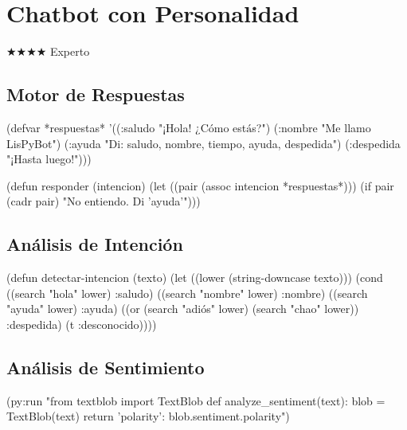 \chapter{Chatbot con Personalidad}
\label{chap:chatbot}
{\huge$\bigstar$}{\huge$\bigstar$}{\huge$\bigstar$}{\huge$\bigstar$} Experto

\section{Motor de Respuestas}
\begin{lispcode}
(defvar *respuestas*
  '((:saludo "\( ¡ \)Hola! \( ¿ \)C\( ó \)mo est\( á \)s?")
    (:nombre "Me llamo LisPyBot")
    (:ayuda "Di: saludo, nombre, tiempo, ayuda, despedida")
    (:despedida "\( ¡ \)Hasta luego!")))

(defun responder (intencion)
  (let ((pair (assoc intencion *respuestas*)))
    (if pair (cadr pair) "No entiendo. Di 'ayuda'")))
\end{lispcode}

\section{Análisis de Intención}
\begin{lispcode}
(defun detectar-intencion (texto)
  (let ((lower (string-downcase texto)))
    (cond ((search "hola" lower) :saludo)
          ((search "nombre" lower) :nombre)
          ((search "ayuda" lower) :ayuda)
          ((or (search "adi\( ó \)s" lower) (search "chao" lower)) :despedida)
          (t :desconocido))))
\end{lispcode}

\section{Análisis de Sentimiento}
\begin{lispcode}
(py:run "from textblob import TextBlob
def analyze_sentiment(text):
    blob = TextBlob(text)
    return {'polarity': blob.sentiment.polarity}")
\end{lispcode}

